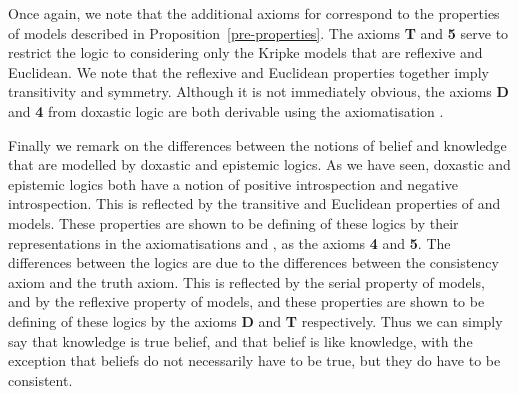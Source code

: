 
Once again, we note that the additional axioms for \axiomS{} correspond to the
properties of \classS{} models described in Proposition~\ref{pre-properties}.
The axioms {\bf T} and {\bf 5} serve to restrict the logic to considering only
the Kripke models that are reflexive and Euclidean.  We note that the reflexive
and Euclidean properties together imply transitivity and symmetry. Although it
is not immediately obvious, the axioms {\bf D} and {\bf 4} from doxastic logic
are both derivable using the axiomatisation \axiomS{}.

Finally we remark on the differences between the notions of belief and knowledge
that are modelled by doxastic and epistemic logics. As we have seen, doxastic
and epistemic logics both have a notion of positive introspection and negative
introspection. This is reflected by the transitive and Euclidean properties of
\classKD{} and \classS{} models. These properties are shown to be defining of
these logics by their representations in the axiomatisations \axiomKD{} and
\axiomS{}, as the axioms {\bf 4} and {\bf 5}. The differences between the logics
are due to the differences between the consistency axiom and the truth axiom.
This is reflected by the serial property of \classKD{} models, and by the
reflexive property of \classS{} models, and these properties are shown to be
defining of these logics by the axioms {\bf D} and {\bf T} respectively. Thus we
can simply say that knowledge is true belief, and that belief is like knowledge,
with the exception that beliefs do not necessarily have to be true, but they do
have to be consistent.
